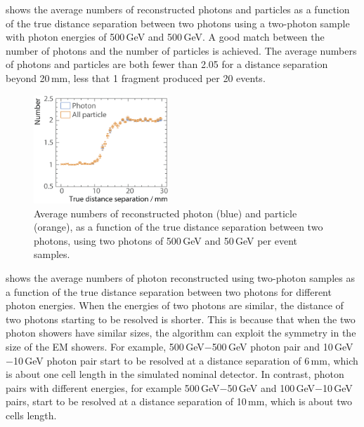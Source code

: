  shows  the average numbers of reconstructed photons and particles  as a function of the true distance separation between two photons using a two-photon sample with photon energies of  500\,GeV and 500\,GeV. A good match between the number of photons and the number of particles is achieved. The average numbers of photons and particles are  both fewer than 2.05 for a distance separation beyond 20\,mm, less that 1 fragment produced per 20 events.



\begin{figure}[tbph]
\centering
        \includegraphics[width=0.45\textwidth]{photon/DoubleN_pN_all3}
        \caption{Average numbers of reconstructed photon  (blue) and particle (orange), as a function of the true distance separation between two photons, using two photons of 500\,GeV and 50\,GeV per event samples. }
        \label{fig:photonDoubleCompareN_pN_all}
\end{figure}


 shows the average numbers of photon reconstructed using two-photon samples as a function of the true distance separation between two photons for different photon energies. When the energies of two photons are similar, the distance of two photons starting to be resolved is shorter. This is because that when the two photon showers have similar sizes, the \peakFinding algorithm can exploit the symmetry in the size of the EM showers. For example, 500\,GeV$-$500\,GeV photon pair and 10\,GeV$-$10\,GeV photon pair start to be resolved at a distance separation of 6\,mm, which is about one \ECAL cell length in the simulated nominal \ILD detector. In contrast, photon pairs with different energies, for example 500\,GeV$-$50\,GeV and  100\,GeV$-$10\,GeV pairs, start to be resolved at a distance separation of 10\,mm, which is about two \ECAL cells length.

